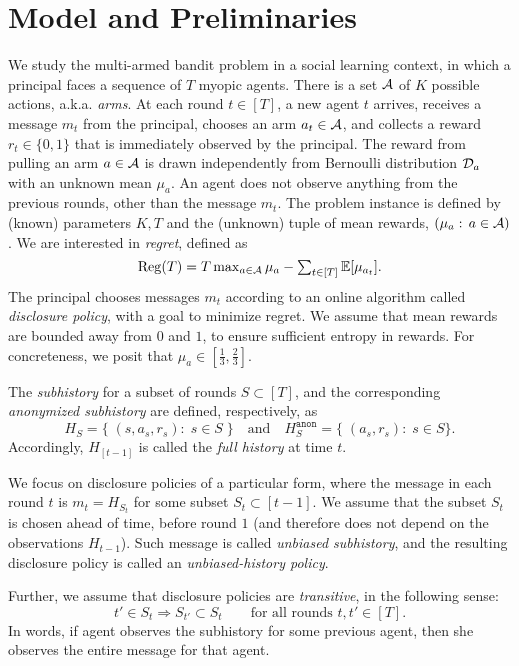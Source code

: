 \section{Model and Preliminaries}
\label{sec:model}

\newcommand{\SubH}[1]{H_{#1}} %
\newcommand{\AnonSubH}[1]{H^{\texttt{anon}}_{#1}} %


We study the multi-armed bandit problem in a social learning context, in which a principal faces a sequence of $T$ myopic agents. There is a set $\mathcal{A}$ of $K$ possible actions, a.k.a. \emph{arms}. At each round $t\in [T]$, a new agent $t$ arrives, receives a message $m_t$ from the principal, chooses an arm $a_t\in \mathcal{A}$, and collects a reward $r_t\in \{0,1\}$ that is immediately observed by the principal. The reward from pulling an arm $a\in \mathcal{A}$ is drawn independently from Bernoulli distribution $\mathcal{D}_a$ with an unknown mean $\mu_a$. An agent does not observe anything from the previous rounds, other than the message $m_t$. The problem instance is defined by (known) parameters $K,T$ and the (unknown) tuple of mean rewards, $(\mu_a:\,a\in\mathcal{A})$. We are interested in \emph{regret}, defined as
\[\textstyle 
  \mathrm{Reg}(T)
  = T \max_{a\in \mathcal{A}} \mu_a -
  \sum_{t\in [T]} \mathbb{E}[\mu_{a_t}].
\]
The principal chooses messages $m_t$ according to an online algorithm called \emph{disclosure policy}, with a goal to minimize regret. We assume that mean rewards are bounded away from $0$ and $1$, to ensure sufficient entropy in rewards. For concreteness, we posit that
    $\mu_a\in [\tfrac13,\tfrac23]$.

The \emph{subhistory} for a subset of rounds $S\subset [T]$, and the corresponding \emph{anonymized subhistory} are defined, respectively, as
\[ \SubH{S} = \{\; (s,a_s,r_s):\;s\in S \;\}
\quad\text{and}\quad
   \AnonSubH{S} = \{\; (a_s,r_s):\;s\in S \}.
\]
Accordingly, $\SubH{[t-1]}$ is called the \emph{full history} at time $t$.


We focus on disclosure policies of a particular form, where the message in each round $t$ is $m_t = \SubH{S_t}$ for some subset $S_t\subset [t-1]$. We assume that the subset $S_t$ is chosen ahead of time, before round $1$ (and therefore does not depend on the observations $\SubH{t-1}$). Such message is called \emph{unbiased subhistory}, and the resulting disclosure policy is called an \emph{unbiased-history policy}.

Further, we assume that disclosure policies are \emph{transitive}, in the following sense:
\[ t'\in S_t \Rightarrow S_{t'}\subset S_t
    \qquad \text{for all rounds $t,t'\in [T]$}. \]
In words, if agent observes the subhistory for some previous agent, then she observes the entire message for that agent. 

